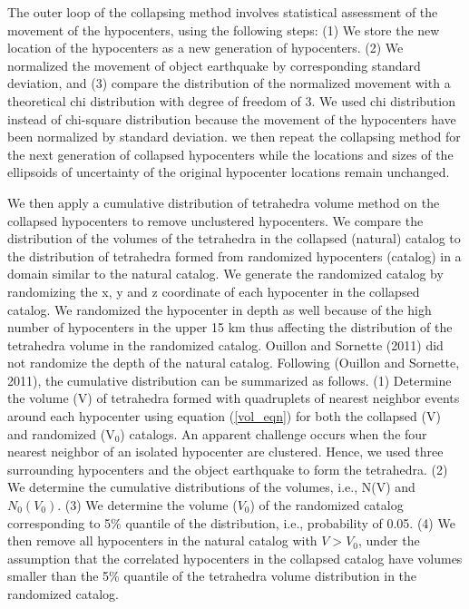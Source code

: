 \documentclass[draft]{agujournal2018}
\begin{document}
The outer loop of the collapsing method involves statistical assessment of the movement of the hypocenters, using the following steps: (1) We store the new location of the hypocenters as a new generation of hypocenters. (2) We normalized the movement of object earthquake by corresponding standard deviation, and (3) compare the distribution of the normalized movement with a theoretical chi distribution with degree of freedom of 3. We used chi distribution instead of chi-square distribution because the movement of the hypocenters have been normalized by standard deviation. we then repeat the collapsing method for the next generation of collapsed hypocenters while the locations and sizes of the ellipsoids of uncertainty of the original hypocenter locations remain unchanged. %

We then apply a cumulative distribution of tetrahedra volume method on the collapsed hypocenters to remove unclustered hypocenters. We compare the distribution of the volumes of the tetrahedra in the collapsed (natural) catalog to the distribution of tetrahedra formed from randomized hypocenters (catalog) in a domain similar to the natural catalog. We generate the randomized catalog by randomizing the x, y and z coordinate of each hypocenter in the collapsed catalog. We randomized the hypocenter in depth as well because of the high number of hypocenters in the upper 15 km thus affecting the distribution of the tetrahedra volume in the randomized catalog. Ouillon and Sornette (2011) did not randomize the depth of the natural catalog.  
Following (Ouillon and Sornette, 2011), the cumulative distribution can be summarized as follows. (1) Determine the volume (V) of tetrahedra formed with quadruplets of nearest neighbor events around each hypocenter using equation (\ref{vol_eqn}) for both the collapsed (V) and randomized (V$_0$) catalogs. An apparent challenge occurs when the four nearest neighbor of an isolated hypocenter are clustered. Hence, we used three surrounding hypocenters and the object earthquake to form the tetrahedra. (2) We determine the cumulative distributions of the volumes, i.e., N(V) and $N_0(V_0)$. (3) We determine the volume ($V_0$) of the randomized catalog corresponding to 5\% quantile of the distribution, i.e., probability of 0.05. (4) We then remove all hypocenters in the natural catalog with $V > V_0$, under the assumption that the correlated hypocenters in the collapsed catalog have volumes smaller than the 5\% quantile of the tetrahedra volume distribution in the randomized catalog. %
\end{document}
